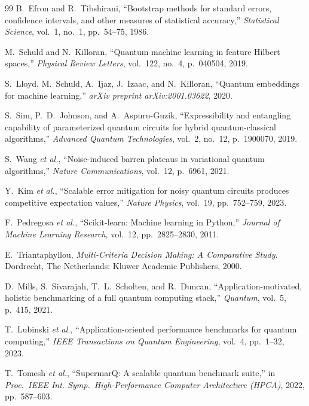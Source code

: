 \documentclass[final,5p,times,number]{elsarticle}
\begin{document}
\begin{thebibliography}{99}
  B.~Efron and R.~Tibshirani, ``Bootstrap methods for standard errors, confidence intervals, and other measures of statistical accuracy,'' \emph{Statistical Science}, vol.~1, no.~1, pp.~54--75, 1986.

  M.~Schuld and N.~Killoran, ``Quantum machine learning in feature Hilbert spaces,'' \emph{Physical Review Letters}, vol.~122, no.~4, p.~040504, 2019.

  S.~Lloyd, M.~Schuld, A.~Ijaz, J.~Izaac, and N.~Killoran, ``Quantum embeddings for machine learning,'' \emph{arXiv preprint arXiv:2001.03622}, 2020.

  S.~Sim, P.~D.~Johnson, and A.~Aspuru-Guzik, ``Expressibility and entangling capability of parameterized quantum circuits for hybrid quantum-classical algorithms,'' \emph{Advanced Quantum Technologies}, vol.~2, no.~12, p.~1900070, 2019.

  S.~Wang \emph{et al.}, ``Noise-induced barren plateaus in variational quantum algorithms,'' \emph{Nature Communications}, vol.~12, p.~6961, 2021.

  Y.~Kim \emph{et al.}, ``Scalable error mitigation for noisy quantum circuits produces competitive expectation values,'' \emph{Nature Physics}, vol.~19, pp.~752--759, 2023.

  F.~Pedregosa \emph{et al.}, ``Scikit-learn: Machine learning in Python,'' \emph{Journal of Machine Learning Research}, vol.~12, pp.~2825--2830, 2011.

  E.~Triantaphyllou, \emph{Multi-Criteria Decision Making: A Comparative Study}. Dordrecht, The Netherlands: Kluwer Academic Publishers, 2000.

  D.~Mills, S.~Sivarajah, T.~L.~Scholten, and R.~Duncan, ``Application-motivated, holistic benchmarking of a full quantum computing stack,'' \emph{Quantum}, vol.~5, p.~415, 2021.

  T.~Lubinski \emph{et al.}, ``Application-oriented performance benchmarks for quantum computing,'' \emph{IEEE Transactions on Quantum Engineering}, vol.~4, pp.~1--32, 2023.

  T.~Tomesh \emph{et al.}, ``SupermarQ: A scalable quantum benchmark suite,'' in \emph{Proc.\ IEEE Int. Symp.\ High-Performance Computer Architecture (HPCA)}, 2022, pp.~587--603.


\end{thebibliography}
\end{document}
